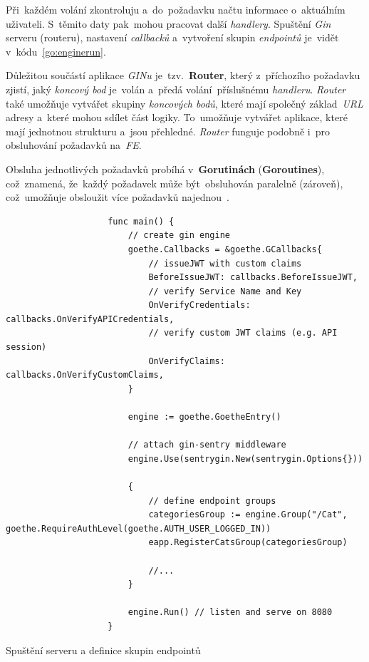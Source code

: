 \documentclass[11pt,a4paper]{report}
\let\oldacrshort\acrshort
\renewcommand{\acrshort}[1]{\emph{\normalsize\color[rgb]{0,0,0}\noindent\oldacrshort{#1}}}
\begin{document}
            Při~každém volání zkontroluju a~do~požadavku načtu informace o~aktuálním uživateli. S~těmito daty pak~mohou pracovat další \emph{handlery}. Spuštění \emph{Gin} serveru (routeru), nastavení \emph{callbacků} a~vytvoření skupin \emph{endpointů} je~vidět v~kódu~\ref{go:enginerun}.

            Důležitou součástí aplikace \emph{GINu} je~tzv.~\textbf{Router}, který z~příchozího požadavku zjistí, jaký \emph{koncový bod} je~volán a~předá volání~příslušnému \emph{handleru}. \emph{Router} také umožňuje vytvářet skupiny \emph{koncových bodů}, které mají společný základ~\emph{URL} adresy a~které mohou sdílet část logiky. To~umožňuje vytvářet aplikace, které mají jednotnou strukturu a~jsou přehledné. \emph{Router} funguje podobně i~pro obsluhování požadavků na~\acrshort{FE}.


            Obsluha jednotlivých požadavků probíhá v~\textbf{Gorutinách} (\textbf{Goroutines}), což~znamená, že~každý požadavek může být~obsluhován paralelně (zároveň), což~umožňuje obsloužit více požadavků najednou~\cite{effective_go}.

            \begin{code}
                \begin{verbatim}
                    func main() {
                    	// create gin engine
                    	goethe.Callbacks = &goethe.GCallbacks{
                    		// issueJWT with custom claims
                    		BeforeIssueJWT: callbacks.BeforeIssueJWT,
                    		// verify Service Name and Key
                    		OnVerifyCredentials: callbacks.OnVerifyAPICredentials,
                    		// verify custom JWT claims (e.g. API session)
                    		OnVerifyClaims: callbacks.OnVerifyCustomClaims,
                    	}
                    
                    	engine := goethe.GoetheEntry()
                    
                    	// attach gin-sentry middleware
                    	engine.Use(sentrygin.New(sentrygin.Options{}))
                    
                    	{
                    		// define endpoint groups
                    		categoriesGroup := engine.Group("/Cat", goethe.RequireAuthLevel(goethe.AUTH_USER_LOGGED_IN))
                    		eapp.RegisterCatsGroup(categoriesGroup)
                      
                            //...
                    	}
                    
                    	engine.Run() // listen and serve on 8080
                    }
                \end{verbatim}
                \caption{Spuštění serveru a definice skupin endpointů}
                \label{go:enginerun}
            \end{code}
\end{document}
